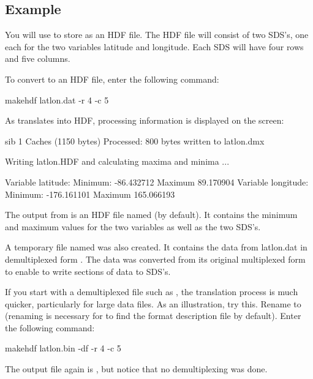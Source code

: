 \subsection{Example}

You will use  to store  as an HDF file.
The HDF file will consist of two SDS's, one each for the two variables
latitude and longitude. Each SDS will have four rows and five columns.

To convert  to an HDF file, enter the following
command:

\begin{example}
makehdf latlon.dat -r 4 -c 5 
\end{example}

As  translates  into HDF, processing
information is displayed on the screen:

\begin{vcode}{sib}
1   Caches (1150 bytes) Processed: 800 bytes written to latlon.dmx 

Writing latlon.HDF and calculating maxima and minima ...

Variable latitude:
Minimum: -86.432712  Maximum 89.170904
Variable longitude:
Minimum: -176.161101  Maximum 165.066193 
\end{vcode}

The output from  is an HDF file named 
(by default). It contains the minimum and maximum values for the two
variables as well as the two SDS's.

A temporary file named  was also created. It contains
the data from latlon.dat in demultiplexed form . The data was
converted from its original multiplexed form to enable 
to write sections of data to SDS's.

If you start with a demultiplexed file such as , the
translation process is much quicker, particularly for large data
files. As an illustration, try this. Rename  to
 (renaming is necessary for  to find the
format description file  by default). Enter the
following command:

\begin{example}
makehdf latlon.bin -df -r 4 -c 5 
\end{example}

The output file again is , but notice that no
demultiplexing was done.

\section{}
\label{ff,hdf,splitdat}

